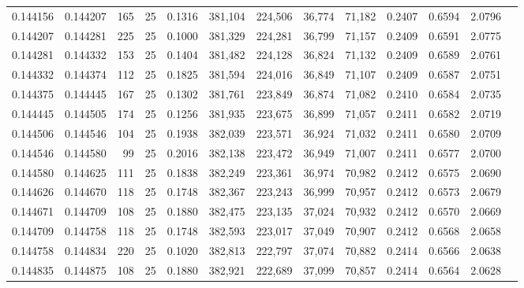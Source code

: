 \begin{tabular}{rrrrrrrrrrrrr}
0.144156 & 0.144207 &   165 &  25 &                                     0.1316 & 381,104 & 224,506 &  36,774 &  71,182 & 0.2407 & 0.6594 & 2.0796 \\
0.144207 & 0.144281 &   225 &  25 &                                     0.1000 & 381,329 & 224,281 &  36,799 &  71,157 & 0.2409 & 0.6591 & 2.0775 \\
0.144281 & 0.144332 &   153 &  25 &                                     0.1404 & 381,482 & 224,128 &  36,824 &  71,132 & 0.2409 & 0.6589 & 2.0761 \\
0.144332 & 0.144374 &   112 &  25 &                                     0.1825 & 381,594 & 224,016 &  36,849 &  71,107 & 0.2409 & 0.6587 & 2.0751 \\
0.144375 & 0.144445 &   167 &  25 &                                     0.1302 & 381,761 & 223,849 &  36,874 &  71,082 & 0.2410 & 0.6584 & 2.0735 \\
0.144445 & 0.144505 &   174 &  25 &                                     0.1256 & 381,935 & 223,675 &  36,899 &  71,057 & 0.2411 & 0.6582 & 2.0719 \\
0.144506 & 0.144546 &   104 &  25 &                                     0.1938 & 382,039 & 223,571 &  36,924 &  71,032 & 0.2411 & 0.6580 & 2.0709 \\
0.144546 & 0.144580 &    99 &  25 &                                     0.2016 & 382,138 & 223,472 &  36,949 &  71,007 & 0.2411 & 0.6577 & 2.0700 \\
0.144580 & 0.144625 &   111 &  25 &                                     0.1838 & 382,249 & 223,361 &  36,974 &  70,982 & 0.2412 & 0.6575 & 2.0690 \\
0.144626 & 0.144670 &   118 &  25 &                                     0.1748 & 382,367 & 223,243 &  36,999 &  70,957 & 0.2412 & 0.6573 & 2.0679 \\
0.144671 & 0.144709 &   108 &  25 &                                     0.1880 & 382,475 & 223,135 &  37,024 &  70,932 & 0.2412 & 0.6570 & 2.0669 \\
0.144709 & 0.144758 &   118 &  25 &                                     0.1748 & 382,593 & 223,017 &  37,049 &  70,907 & 0.2412 & 0.6568 & 2.0658 \\
0.144758 & 0.144834 &   220 &  25 &                                     0.1020 & 382,813 & 222,797 &  37,074 &  70,882 & 0.2414 & 0.6566 & 2.0638 \\
0.144835 & 0.144875 &   108 &  25 &                                     0.1880 & 382,921 & 222,689 &  37,099 &  70,857 & 0.2414 & 0.6564 & 2.0628 \\

\end{tabular}
